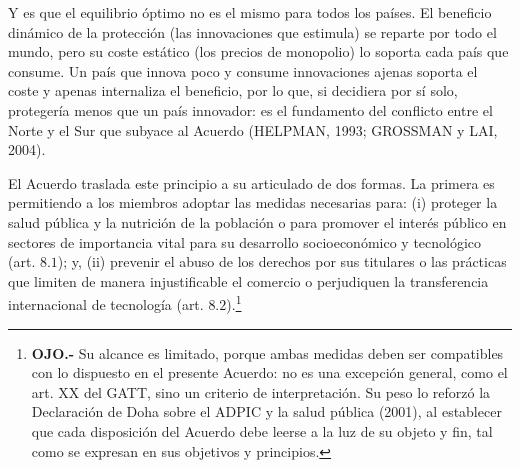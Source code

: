 \documentclass[10pt,a4paper]{article}
\begin{document}
Y es que el equilibrio óptimo no es el mismo para todos los países. El beneficio dinámico de la protección (las innovaciones que estimula) se reparte por todo el mundo, pero su coste estático (los precios de monopolio) lo soporta cada país que consume. Un país que innova poco y consume innovaciones ajenas soporta el coste y apenas internaliza el beneficio, por lo que, si decidiera por sí solo, protegería menos que un país innovador: es el fundamento del conflicto entre el Norte y el Sur que subyace al Acuerdo (HELPMAN, 1993; GROSSMAN y LAI, 2004).

El Acuerdo traslada este principio a su articulado de dos formas. La primera es permitiendo a los miembros adoptar las medidas necesarias para: (i) proteger la salud pública y la nutrición de la población o para promover el interés público en sectores de importancia vital para su desarrollo socioeconómico y tecnológico (art. $8.1$); y, (ii) prevenir el abuso de los derechos por sus titulares o las prácticas que limiten de manera injustificable el comercio o perjudiquen la transferencia internacional de tecnología (art. $8.2$).\footnote{%
  \textbf{OJO.-} Su alcance es limitado, porque ambas medidas deben ser compatibles con lo dispuesto en el presente Acuerdo: no es una excepción general, como el art. XX del GATT, sino un criterio de interpretación. Su peso lo reforzó la Declaración de Doha sobre el ADPIC y la salud pública (2001), al establecer que cada disposición del Acuerdo debe leerse a la luz de su objeto y fin, tal como se expresan en sus objetivos y principios.
}
\end{document}
